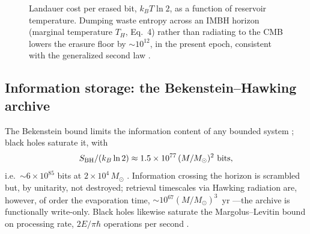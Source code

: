 \documentclass[11pt]{article}
\newcommand{\msun}{M_\odot}
\begin{document}
\begin{figure}[t]
\centering
{}
\caption{Landauer cost per erased bit, $k_B T \ln 2$, as a function of reservoir temperature. Dumping waste entropy across an IMBH horizon (marginal temperature $T_H$, Eq.~4) rather than radiating to the CMB lowers the erasure floor by ${\sim}10^{12}$, in the present epoch, consistent with the generalized second law \citep{bekenstein1974}.}
\label{fig:landauer}
\end{figure}

\subsection{Information storage: the Bekenstein--Hawking archive}
The Bekenstein bound limits the information content of any bounded system \citep{bekenstein1981,casini2008}; black holes saturate it, with
\begin{equation}
S_{\rm BH}/(k_B \ln 2) \approx 1.5\times10^{77}\,(M/\msun)^{2}\ \text{bits},
\end{equation}
i.e.\ ${\sim}6\times10^{85}$ bits at $2\times10^{4}\,\msun$ \citep{bekenstein1973,lloyd2000}. Information crossing the horizon is scrambled but, by unitarity, not destroyed; retrieval timescales via Hawking radiation are, however, of order the evaporation time, ${\sim}10^{67}(M/\msun)^{3}$~yr \citep{page1976}---the archive is functionally write-only. Black holes likewise saturate the Margolus--Levitin bound on processing rate, $2E/\pi\hbar$ operations per second \citep{margolus1998,lloyd2000}.
\end{document}
